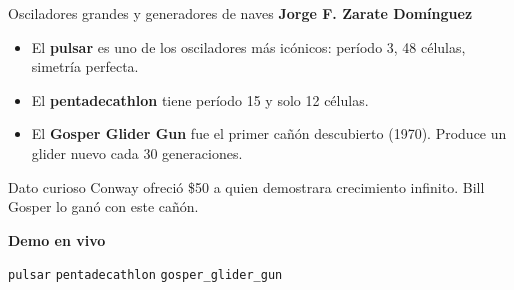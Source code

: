 \documentclass[10pt,aspectratio=169]{beamer}
\newcommand{\demo}[1]{\textcolor{democolor}{\texttt{#1}}}
\begin{document}
\begin{frame}{Osciladores grandes y generadores de naves}
  \textbf{Jorge F. Zarate Domínguez}

  \vspace{0.4cm}

  \begin{itemize}
    \item El \textbf{pulsar} es uno de los osciladores más icónicos:
          período 3, 48 células, simetría perfecta.
    \item El \textbf{pentadecathlon} tiene período 15 y solo 12 células.
    \item El \textbf{Gosper Glider Gun} fue el primer cañón descubierto
          (1970). Produce un glider nuevo cada 30 generaciones.
  \end{itemize}

  \begin{alertblock}{Dato curioso}
    Conway ofreció \$50 a quien demostrara crecimiento infinito.
    Bill Gosper lo ganó con este cañón.
  \end{alertblock}

  \vspace{0.3cm}

  \begin{center}
    \textbf{Demo en vivo}

    \demo{pulsar} \quad \demo{pentadecathlon} \quad \demo{gosper\_glider\_gun}
  \end{center}
\end{frame}
\end{document}
